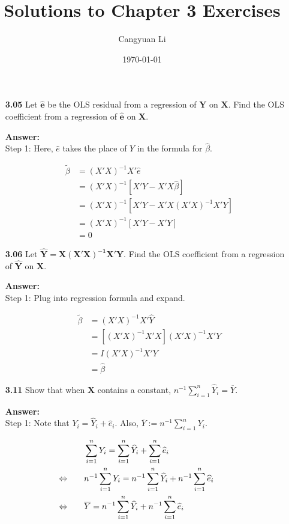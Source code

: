 \documentclass[14pt]{extreport}
\title{Solutions to Chapter 3 Exercises}
\author{Cangyuan Li}
\date{\today}
\newcommand{\eq}[0]{\llap{\(\Leftrightarrow\)\qquad}}
\newcommand{\answer}[0]{\medskip \textbf{Answer:} \medskip \\}
\newcommand{\sumn}[0]{\sum\limits_{i=1}^n}
\begin{document}
\maketitle

\begin{enumerate}

    \item [\textbf{3.05}] Let \( \mathbf{\widehat{e}} \) be the OLS residual from a regression of \( \mathbf{Y} \) on \( \mathbf{X} \). Find the OLS coefficient from a regression of \( \mathbf{\widehat{e}} \) on \( \mathbf{X} \). 
    
    \answer
    Step 1: Here, \( \widehat{e} \) takes the place of \( Y \) in the formula for \( \widehat{\beta} \). 

    \begin{align*}
        \widetilde{\beta} &= (X'X)^{-1} X'\widehat{e} \\
        &= (X'X)^{-1} \left[ X'Y - X'X\widehat{\beta} \right] \\
        &= (X'X)^{-1} \left[ X'Y - X'X (X'X)^{-1} X'Y \right] \\
        &= (X'X)^{-1} \left[ X'Y - X'Y \right] \\
        &= 0
    \end{align*}
    

    \item [\textbf{3.06}] Let \( \mathbf{\widehat{Y} = X(X'X)^{-1} X'Y} \). Find the OLS coefficient from a regression of \( \mathbf{\widehat{Y}} \) on \( \mathbf{X} \). 
    
    \answer
    Step 1: Plug into regression formula and expand.

    \begin{align*}
        \widetilde{\beta} &= (X'X)^{-1} X'\widehat{Y} \\
        &= \left[ (X'X)^{-1} X'X \right] (X'X)^{-1} X'Y \\
        &= I (X'X)^{-1} X'Y \\
        &= \widehat{\beta}
    \end{align*}


    \item [\textbf{3.11}] Show that when \( \mathbf{X} \) contains a constant, \( n^{-1} \sumn \widehat{Y}_i = \overline{Y} \).

    \answer
    Step 1: Note that \( Y_i = \widehat{Y}_i + \widehat{e}_i \). 
    Also, \( \overline{Y} := n^{-1} \sumn Y_i \).

    \begin{align*}
        &\sumn Y_i = \sumn \widehat{Y}_i + \sumn \widehat{e}_i \\
        &\eq n^{-1} \sumn Y_i = n^{-1} \sumn \widehat{Y}_i + n^{-1} \sumn \widehat{e}_i \\
        &\eq \overline{Y} = n^{-1} \sumn \widehat{Y}_i + n^{-1} \sumn \widehat{e}_i
    \end{align*}


\end{enumerate}
\end{document}
